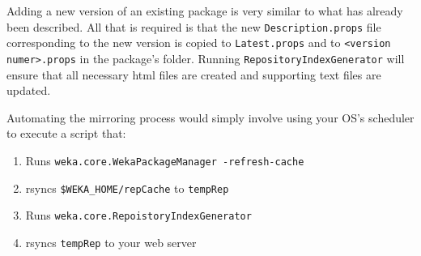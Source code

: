 Adding a new version of an existing package is very similar to what
has already been described. All that is required is that the new
\texttt{Description.props} file corresponding to the new version is
copied to \texttt{Latest.props} and to \texttt{<version numer>.props}
in the package's folder. Running \texttt{RepositoryIndexGenerator}
will ensure that all necessary html files are created and supporting
text files are updated.

Automating the mirroring process would simply involve using your OS's
scheduler to execute a script that:

\begin{enumerate}
\item Runs \texttt{weka.core.WekaPackageManager -refresh-cache}
\item rsyncs \verb=$WEKA_HOME/repCache= to \texttt{tempRep}
\item Runs \texttt{weka.core.RepoistoryIndexGenerator}
\item rsyncs \texttt{tempRep} to your web server
\end{enumerate}
